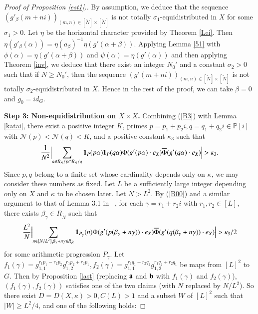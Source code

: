 \documentclass[12pt,amstex]{amsart}
\theoremstyle{definition}
\def \P {\mathbb{P}[i]}
\def \A {\alpha}
\def \B {\beta}
\def \C {\gamma}
\def \D {\kappa}
\def \R {R_{\tilde{N}}}
\def \a {\bold{a}}
\def \b {\bold{b}}
\begin{document}
\begin{proof}[Proof of Proposition \ref{est1}.]
By assumption, we deduce that the sequence $(g'_{\B}(m+ni))_{(m,n)\in[\tilde{N}]\times[\tilde{N}]}$ is not totally
 $\sigma_{1}$-equidistributed in $X$ for some $\sigma_{1}>0$. 
Let $\eta$ be the horizontal character provided by Theorem \ref{Lei}. Then 
$\eta(g'_{\B}(\A))=\eta(a_{\B})^{-1}\eta(g'(\A+\B))$.
Applying Lemma \ref{51} with $\phi(\A)=\eta(g'(\A+\B))$ and $\psi(\A)=\eta(g'(\A))$ and then applying
Theorem \ref{inv}, we deduce that there exist an integer $N_{0}'$ and a constant 
$\sigma_{2}>0$ such that if $N\geq N_{0}'$, then the sequence $(g'(m+ni))_{(m,n)\in[\tilde{N}]\times[\tilde{N}]}$ 
is not totally $\sigma_{2}$-equidistributed in $X$. Hence in the rest of the proof, we can take $\B=0$ 
and $g_{0}=id_{G}$.

\textbf{Step 3: Non-equidistribution on $X\times X$.}
Combining (\ref{B3}) with Lemma \ref{katai}, there exist a positive integer $K$, primes $p=p_{1}+p_{2}i,q=q_{1}+q_{2}i\in\P$ with $\mathcal{N}(p)<\mathcal{N}(q)<K$, and a positive constant $\D_{3}$ such that
\begin{equation}\label{B00}
  \begin{split}
   \frac{1}{N^{2}}\Bigl\vert\sum_{\A\in \R/p\cap \R/q}\bold{1}_{P}(p\A)\bold{1}_{P}(q\A)\Phi(g'(p\A)\cdot e_{X})\overline{\Phi}
   (g'(q\A)\cdot e_{X})\Bigr\vert>\D_{3}.
  \end{split}
  \end{equation}
Since $p,q$ belong to a finite set whose cardinality depends only on $\D$, we may consider these numbers as fixed. Let $L$ be a sufficiently large integer depending only on $X$ and $\D$ to be chosen later. Let $N>L^{2}$. By (\ref{B00}) and a similar argument to that of Lemma 3.1 in ~\cite{er2}, for each $\C=r_{1}+r_{2}i$ with $r_{1},r_{2}\in[L]$, there exists $\B_{\C}\in \R$ such that
\begin{equation}\label{B001}
  \begin{split}
   \frac{L^{2}}{N}\Bigl\vert\sum_{n\in[N/L^{2}],\B_{\C}+n\C\in \R}\bold{1}_{P_{\C}}(n)\Phi(g'(p(\B_{\C}+n\C))\cdot e_{X})\overline{\Phi}
   (g'(q(\B_{\C}+n\C))\cdot e_{X})\Bigr\vert>\D_{3}/2
  \end{split}
  \end{equation}
for some arithmetic progression $P_{\C}$. Let $f_{1}(\C)=g_{1,1}^{r_{1}p_{1}-r_{2}p_{2}}g_{1,2}^{r_{1}p_{2}+r_{2}p_{1}},
f_{2}(\C)=g_{1,1}^{r_{1}q_{1}-r_{2}q_{2}}g_{1,2}^{r_{1}q_{2}+r_{2}q_{1}}$ be maps from $[L]^{2}$ to $G$. Then by Proposition \ref{last} (replacing $\a$ and $\b$ with $f_{1}(\C)$ and $f_{2}(\C)$), $(f_{1}(\C),f_{2}(\C))$ satisfies one of the two claims (with $N$ replaced by $N/L^{2}$). So there exist $D=D(X,\D)>0, C(L)>1$ and a subset $W$ of $[L]^{2}$ such that $\vert W\vert\geq L^{2}/4$, and one of the following holds:


\end{proof}
\end{document}
